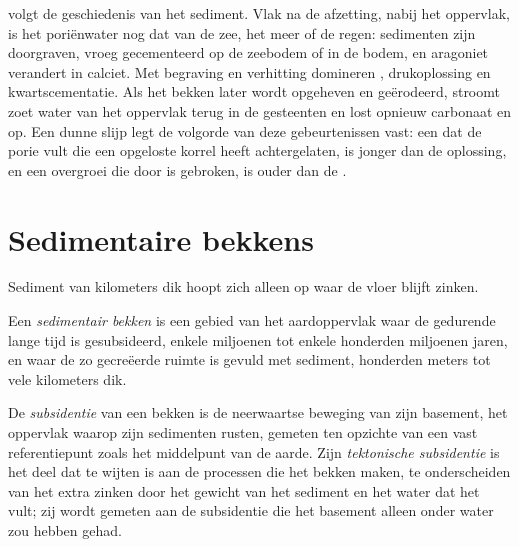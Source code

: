  volgt de geschiedenis van het sediment. Vlak na de afzetting, nabij het oppervlak, is het poriënwater nog dat van de zee, het meer of de regen: sedimenten zijn doorgraven, vroeg gecementeerd op de zeebodem of in de bodem, en aragoniet verandert in calciet. Met begraving en verhitting domineren , drukoplossing en kwartscementatie. Als het bekken later wordt opgeheven en geërodeerd, stroomt zoet water van het oppervlak terug in de gesteenten en lost opnieuw carbonaat en  op. Een dunne slijp legt de volgorde van deze gebeurtenissen vast: een  dat de porie vult die een opgeloste korrel heeft achtergelaten, is jonger dan de oplossing, en een overgroei die door  is gebroken, is ouder dan de .

\section{Sedimentaire bekkens}\label{sec:b1:diagenesis-basins:basins}

Sediment van kilometers dik hoopt zich alleen op waar de vloer blijft zinken.

\begin{definition}\label{def:b1:diagenesis-basins:basin}
Een \emph{sedimentair bekken} is een gebied van het aardoppervlak waar de  gedurende lange tijd is gesubsideerd, enkele miljoenen tot enkele honderden miljoenen jaren, en waar de zo gecreëerde ruimte is gevuld met sediment, honderden meters tot vele kilometers dik.
\end{definition}

\begin{definition}\label{def:b1:diagenesis-basins:subsidence}
De \emph{subsidentie} van een bekken is de neerwaartse beweging van zijn basement, het oppervlak waarop zijn sedimenten rusten, gemeten ten opzichte van een vast referentiepunt zoals het middelpunt van de aarde. Zijn \emph{tektonische
subsidentie} is het deel dat te wijten is aan de processen die het bekken maken, te onderscheiden van het extra zinken door het gewicht van het sediment en het water dat het vult; zij wordt gemeten aan de subsidentie die het basement alleen onder water zou hebben gehad.
\end{definition}

